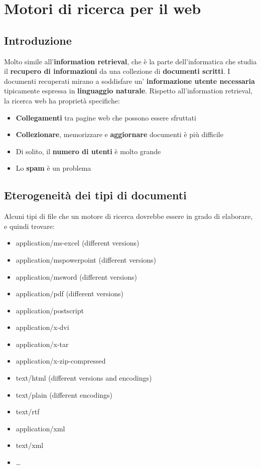 
\chapter{Motori di ricerca per il web}
\section{Introduzione}
Molto simile all'\textbf{information retrieval}, che è la parte dell'informatica
che studia il \textbf{recupero di informazioni} da una collezione di
\textbf{documenti scritti}. I documenti recuperati mirano a soddisfare un' \textbf{informazione utente necessaria} tipicamente espressa in \textbf{linguaggio naturale}. Rispetto all'information retrieval, la ricerca web ha proprietà specifiche:
\begin{itemize}
    \item \textbf{Collegamenti} tra pagine web che possono essere sfruttati
    \item \textbf{Collezionare}, memorizzare e \textbf{aggiornare} documenti è più difficile
    \item Di solito, il \textbf{numero di utenti} è molto grande
    \item Lo \textbf{spam} è un problema
\end{itemize}

\section{Eterogeneità dei tipi di documenti}
Alcuni tipi di file che un motore di ricerca dovrebbe essere in grado di elaborare, e quindi trovare: 
\begin{multicols}{2}
\begin{itemize}
    \item application/ms-excel (different versions)
    \item application/mspowerpoint (different versions)
    \item application/msword (different versions)
    \item application/pdf (different versions)
    \item application/postscript
    \item application/x-dvi
    \item application/x-tar
\end{itemize}
\begin{itemize}
    \item application/x-zip-compressed
    \item text/html (different versions and encodings)
    \item text/plain (different encodings)
    \item text/rtf
    \item application/xml
    \item text/xml
    \item \dots
\end{itemize}
\end{multicols}


